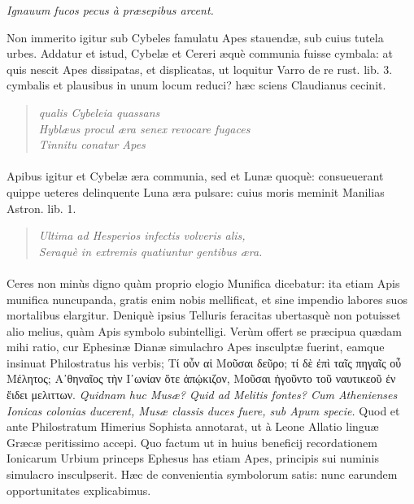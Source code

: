 \documentclass[a4paper, 11pt, oneside, polutonikogreek, latin]{article}
\begin{document}
\emph{Ignauum fucos pecus à præsepibus arcent.}

Non immerito igitur sub Cybeles famulatu Apes stauendæ, sub cuius tutela urbes. Addatur et istud, Cybelæ et Cereri æquè communia fuisse cymbala: at quis nescit Apes dissipatas, et displicatas, ut loquitur Varro de re rust. lib. 3. cymbalis et plausibus in unum locum reduci? hæc sciens Claudianus cecinit.
\begin{quote}
\hspace*{15mm}\emph{qualis Cybeleia quassans}\\
\emph{Hyblæus procul æra senex revocare fugaces}\\
\emph{Tinnitu conatur Apes}\\
\end{quote}
\paragraph{}
Apibus igitur et Cybelæ æra communia, sed et Lunæ quoquè: consueuerant quippe ueteres delinquente Luna æra pulsare: cuius moris meminit Manilias Astron. lib. 1.
\begin{quote}
\emph{Ultima ad Hesperios infectis volveris alis,}\\
\emph{Seraquè in extremis quatiuntur gentibus æra.}\\
\end{quote}
\paragraph{}
Ceres non minùs digno quàm proprio elogio Munifica dicebatur: ita etiam Apis munifica nuncupanda, gratis enim nobis mellificat, et sine impendio labores suos mortalibus elargitur. Deniquè ipsius Telluris feracitas ubertasquè non potuisset alio melius, quàm Apis symbolo subintelligi. Verùm offert se præcipua quædam mihi ratio, cur Ephesinæ Dianæ simulachro Apes insculptæ fuerint, eamque insinuat Philostratus his verbis; Τί οὖν αἱ Μοῦσαι δεῦρο; τί δὲ ἐπὶ ταῖς πηγαῖς οὖ Μέλητος; Α᾽θηναῖος τὴν I᾽ωνίαν ὅτε ἀπῴκιζον, Μοῦσαι ἡγοῦντο τοῦ ναυτικεοῦ ἐν ἔιδει μελιττων. \emph{Quidnam huc Musæ? Quid ad Melitis fontes? Cum Athenienses Ionicas colonias ducerent, Musæ classis duces fuere, sub Apum specie.} Quod et ante Philostratum Himerius Sophista annotarat, ut à Leone Allatio linguæ Græcæ peritissimo accepi. Quo factum ut in huius beneficij recordationem Ionicarum Urbium princeps Ephesus has etiam Apes, principis sui numinis simulacro insculpserit. Hæc de convenientia symbolorum satis: nunc earundem opportunitates explicabimus.
\clearpage
\end{document}
